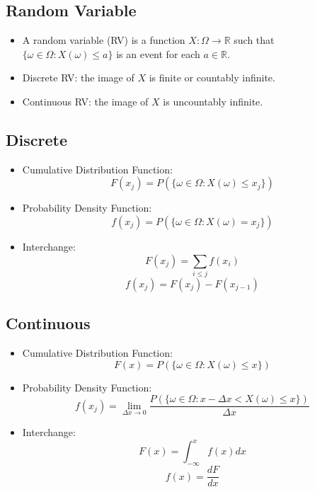 \documentclass[11pt]{article}
\begin{document}
\subsection{Random Variable}
\begin{itemize}
\item A random variable (RV) is a function $X:\Omega \to \mathbb{R}$ such that $\{ \omega \in \Omega : X(\omega) \le a \}$ is an event for each $a \in \mathbb{R}$. 
\item Discrete RV: the image of $X$ is finite or countably infinite.
\item Continuous RV: the image of $X$ is uncountably infinite.
\end{itemize}

\subsection{Discrete}
\begin{itemize}
\item Cumulative Distribution Function:
\begin{equation}
F(x_j) = P( \{\omega \in \Omega : X(\omega) \le x_j \} )
\end{equation}
\item Probability Density Function:
\begin{equation}
f(x_j) = P( \{ \omega \in \Omega : X(\omega) = x_j \} )
\end{equation}
\item Interchange:
\begin{equation}
F(x_j) = \sum_{i \le j} f(x_i)
\end{equation}
\begin{equation}
f(x_j) = F(x_j) - F(x_{j-1})
\end{equation}
\end{itemize}

\subsection{Continuous}
\begin{itemize}
\item Cumulative Distribution Function:
\begin{equation}
F(x) = P( \{\omega \in \Omega : X(\omega) \le x \} )
\end{equation}
\item Probability Density Function:
\begin{equation}
f(x_j) = \lim_{\Delta x \to 0} \frac{P( \{ \omega \in \Omega : x - \Delta x < X(\omega) \le x \} )}{\Delta x}
\end{equation}
\item Interchange:
\begin{equation}
F(x) = \int_{-\infty}^x f(x) dx
\end{equation}
\begin{equation}
f(x) = \frac{dF}{dx}
\end{equation}
\end{itemize}
\end{document}
